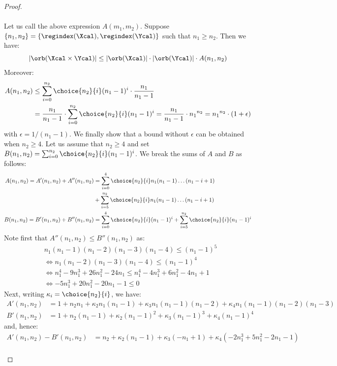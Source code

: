 \begin{proof}
\begin{enumerate}
\begin{align*}
	\end{align*}
        Let us call the above expression $A(m_1,m_2)$.
        Suppose $\{n_1, n_2\} = \{\regindex(\Xcal), \regindex(\Ycal)\}$ such that $n_1 \ge n_2$.
        Then we have:
        \[
        |\orb(\Xcal \times \Ycal)| \le |\orb(\Xcal)|\cdot|\orb(\Ycal)|\cdot A(n_1,n_2)
      \]
      Moreover:
      \begin{align*}
A(n_1,n_2) &\le \sum^{n_2}_{i = 0} 
		\choice{n_2}{i}
		(n_1-1)^i \cdot \frac{n_1}{n_1 - 1}
        \\ &
=  \frac{n_1}{n_1 - 1}\cdot\sum^{n_2}_{i = 0} 
		\choice{n_2}{i}
		(n_1-1)^i 
=  \frac{n_1}{n_1 - 1}\cdot {n_1}^{n_2}=  {n_1}^{n_2}\cdot (1 + \epsilon) 
      \end{align*}
      with $\epsilon=1/(n_1-1)$. We finally show that a bound without $\epsilon$ can be obtained when $n_2\ge 4$. Let us assume that $n_2\ge 4$ and set
      $B(n_1,n_2)=\sum^{n_2}_{i = 0} \choice{n_2}{i} (n_1-1)^i$. We break the sums of $A$ and $B$ as follows:
      \begin{align*}
        A(n_1,n_2) = A'(n_1,n_2)+A''(n_1,n_2) &=
\sum^{4}_{i = 0} \choice{n_2}{i} n_1(n_1 - 1)\dots(n_1 - i + 1)\\ & +
\sum^{n_2}_{i = 5} \choice{n_2}{i} n_1(n_1 - 1)\dots(n_1 - i + 1)\\
B(n_1,n_2) = B'(n_1,n_2)+B''(n_1,n_2) &=
\sum^{4}_{i = 0} \choice{n_2}{i} (n_1 - 1)^i+
\sum^{n_2}_{i = 5} \choice{n_2}{i} (n_1 - 1)^i
\end{align*}                                                
Note first that $A''(n_1,n_2)\leq B''(n_1,n_2)$ as:
\begin{align*}
& n_1(n_1-1)(n_1-2)(n_1-3)(n_1-4)\leq (n_1-1)^5\\
&\iff n_1(n_1-2)(n_1-3)(n_1-4)\leq (n_1-1)^4 \\
&\iff n_1^4-9n_1^3+26n_1^2-24n_1\leq n_1^4-4n_1^3+6n_1^2-4n_1+1\\
&\iff -5n_1^3+20n_1^2-20n_1-1\leq 0
\end{align*}
Next, writing $\kappa_i=\choice{n_2}{i}$, we have:
\begin{align*}
  A'(n_1,n_2) &= 1+n_2n_1+\kappa_2n_1(n_1-1)+\kappa_3n_1(n_1-1)(n_1-2)+\kappa_4n_1(n_1-1)(n_1-2)(n_1-3)\\
 B'(n_1,n_2) &= 1+n_2(n_1-1)+\kappa_2(n_1-1)^2+\kappa_3(n_1-1)^3+\kappa_4(n_1-1)^4
\end{align*}
and, hence:
\begin{align*}
  A'(n_1,n_2)-B'(n_1,n_2) &= n_2+\kappa_2(n_1-1)+\kappa_3(-n_1+1)+\kappa_4(-2n_1^3+5n_1^2-2n_1-1)\\

\end{align*}
\end{enumerate}
\end{proof}
